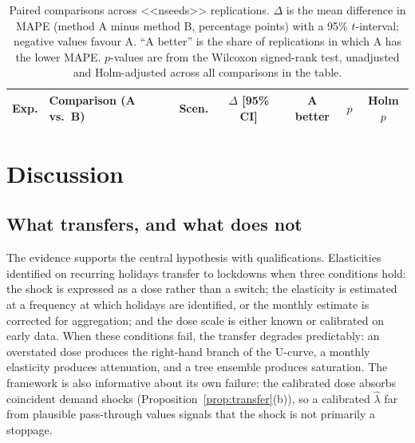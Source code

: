 \documentclass{article}
\theoremstyle{plain}
\theoremstyle{definition}
\theoremstyle{remark}
\begin{document}
\begin{table}[!tb]
\centering
\caption{Paired comparisons across <<nseeds>> replications. $\Delta$ is the mean difference in MAPE (method A minus method B, percentage points) with a 95\% $t$-interval; negative values favour A. ``A better'' is the share of replications in which A has the lower MAPE. $p$-values are from the Wilcoxon signed-rank test, unadjusted and Holm-adjusted across all comparisons in the table.}
\label{tab:paired}
\scriptsize
\setlength{\tabcolsep}{3.5pt}
\begin{tabular}{lllcccc}
\toprule
Exp. & Comparison (A vs.\ B) & Scen. & $\Delta$ [95\% CI] & A better & $p$ & Holm $p$ \\
\midrule
\bottomrule
\end{tabular}
\end{table}

\section{Discussion}\label{sec:discussion}
\subsection{What transfers, and what does not}
The evidence supports the central hypothesis with qualifications. Elasticities identified on recurring holidays transfer to lockdowns when three conditions hold: the shock is expressed as a dose rather than a switch; the elasticity is estimated at a frequency at which holidays are identified, or the monthly estimate is corrected for aggregation; and the dose scale is either known or calibrated on early data. When these conditions fail, the transfer degrades predictably: an overstated dose produces the right-hand branch of the U-curve, a monthly elasticity produces attenuation, and a tree ensemble produces saturation. The framework is also informative about its own failure: the calibrated dose absorbs coincident demand shocks (Proposition~\ref{prop:transfer}(b)), so a calibrated $\hat\lambda$ far from plausible pass-through values signals that the shock is not primarily a stoppage.
\end{document}
